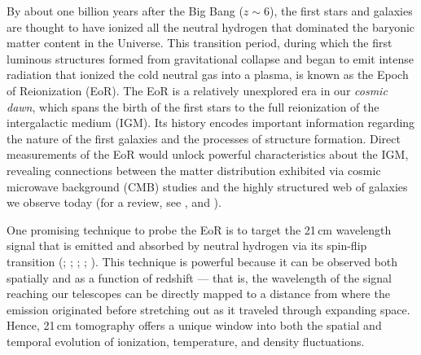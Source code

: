 \documentclass[preprint2,numberedappendix,tighten]{aastex6}  %
\begin{document}
By about one billion years after the Big Bang ($z \sim 6$), the first stars and galaxies are thought to have ionized all the 
neutral hydrogen that dominated the baryonic matter content in the Universe. This transition period, during which the first 
luminous structures formed from gravitational collapse and began to emit intense radiation that ionized the cold neutral gas 
into a plasma, is known as the Epoch of Reionization (EoR). The EoR is a relatively unexplored era in our \textit{cosmic dawn}, which spans the birth of the first stars to the full reionization of the intergalactic medium (IGM). Its 
history encodes important information regarding the nature of the first galaxies and the processes of structure formation. 
Direct measurements of the EoR would unlock powerful characteristics about the IGM, revealing connections 
between the matter distribution exhibited via cosmic microwave background (CMB) studies and the highly structured 
web of galaxies we observe today (for a review, see \citet{barkana_and_loeb2001}, \citet{furlanetto_et_al2006} and \citet{loeb_furlanetto_2013}).

One promising technique to probe the EoR is to target the 21\,cm wavelength signal that is emitted and absorbed by neutral hydrogen via 
its spin-flip transition (\citealt{furlanetto_et_al2006}; \citealt{barkana_and_loeb2008}; \citealt{morales_and_wyithe2010}; \citealt{pritchard_and_loeb2010}; \citealt{pritchard_loeb2012}). This technique is powerful because it can be observed both spatially and as a function of redshift --- that is, the wavelength 
of the signal reaching our telescopes can be directly mapped to a distance from where the emission originated before 
stretching out as it traveled through expanding space. Hence, 21\,cm tomography offers a unique window into both the spatial and temporal
evolution of ionization, temperature, and density fluctuations.
\end{document}
